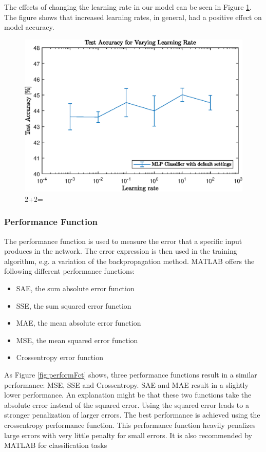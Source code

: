 The effects of changing the learning rate in our model can be seen in Figure \ref{fig:learningRate}. The figure shows that increased learning rates, in general, had a positive effect on model accuracy.


\begin{figure}[h!]
    \centering
    \includegraphics{images/learningRate.eps}
    \caption{2+2=}
    \label{fig:learningRate}
 \end{figure}

\FloatBarrier
 \subsubsection{Performance Function}
 
 The performance function is used to measure the error that a specific input produces in the network. The error expression is then used in the training algorithm, e.g. a variation of the backpropagation method. MATLAB offers the following different performance functions:
 
 \begin{itemize}
 	\item SAE, the sum absolute error function
 	\item SSE, the sum squared error function
 	\item MAE, the mean absolute error function
 	\item MSE, the mean squared error function
 	\item Crossentropy error function
 \end{itemize}
 
 As Figure \ref{fig:performFct} shows, three performance functions result in a similar performance: MSE, SSE and Crossentropy. SAE and MAE result in a slightly lower performance. An explanation might be that these two functions take the absolute error instead of the squared error. Using the squared error leads to a stronger penalization of larger errors. The best performance is achieved using the crossentropy performance function. This performance function heavily penalizes large errors with very little penalty for small errors. It is also recommended by MATLAB for classification tasks
 
